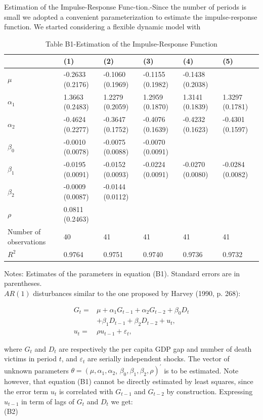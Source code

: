 \documentclass[10pt]{article}
\begin{document}
Estimation of the Impulse-Response Func-tion.-Since the number of periods is small we adopted a convenient parameterization to estimate the impulse-response function. We started considering a flexible dynamic model with

\begin{table}[h]
\begin{center}
\captionsetup{labelformat=empty}
\caption{Table B1-Estimation of the Impulse-Response Function}
\begin{tabular}{|l|l|l|l|l|l|}
\hline
 & (1) & (2) & (3) & (4) & (5) \\
\hline
$\mu$ & -0.2633 (0.2176) & -0.1060 (0.1969) & -0.1155 (0.1982) & -0.1438 (0.2038) &  \\
\hline
$\alpha_{1}$ & 1.3663 (0.2483) & 1.2279 (0.2059) & 1.2959 (0.1870) & 1.3141 (0.1839) & 1.3297 (0.1781) \\
\hline
$\alpha_{2}$ & -0.4624 (0.2277) & -0.3647 (0.1752) & -0.4076 (0.1639) & -0.4232 (0.1623) & -0.4301 (0.1597) \\
\hline
$\beta_{0}$ & -0.0010 (0.0078) & -0.0075 (0.0088) & -0.0070 (0.0091) &  &  \\
\hline
$\beta_{1}$ & -0.0195 (0.0091) & -0.0152 (0.0093) & -0.0224 (0.0091) & -0.0270 (0.0080) & -0.0284 (0.0082) \\
\hline
$\beta_{2}$ & -0.0009 (0.0087) & -0.0144 (0.0112) &  &  &  \\
\hline
$\rho$ & 0.0811 (0.2463) &  &  &  &  \\
\hline
Number of observations & 40 & 41 & 41 & 41 & 41 \\
\hline
$R^{2}$ & 0.9764 & 0.9751 & 0.9740 & 0.9736 & 0.9732 \\
\hline
\end{tabular}
\end{center}
\end{table}

Notes: Estimates of the parameters in equation (B1). Standard errors are in parentheses.\\
$A R(1)$ disturbances similar to the one proposed by Harvey (1990, p. 268):


\begin{align*}
G_{t}= & \mu+\alpha_{1} G_{t-1}+\alpha_{2} G_{t-2}+\beta_{0} D_{t}  \tag{B1}\\
& +\beta_{1} D_{t-1}+\beta_{2} D_{t-2}+u_{t}, \\
u_{t}= & \rho u_{t-1}+\varepsilon_{t},
\end{align*}


where $G_{t}$ and $D_{t}$ are respectively the per capita GDP gap and number of death victims in period $t$, and $\varepsilon_{t}$ are serially independent shocks. The vector of unknown parameters $\theta=\left(\mu, \alpha_{1}, \alpha_{2}\right.$, $\left.\beta_{0}, \beta_{1}, \beta_{2}, \rho\right)^{\prime}$ is to be estimated. Note however, that equation (B1) cannot be directly estimated by least squares, since the error term $u_{t}$ is correlated with $G_{t-1}$ and $G_{t-2}$ by construction. Expressing $u_{t-1}$ in term of lags of $G_{t}$ and $D_{t}$ we get:\\
(B2)
\end{document}
